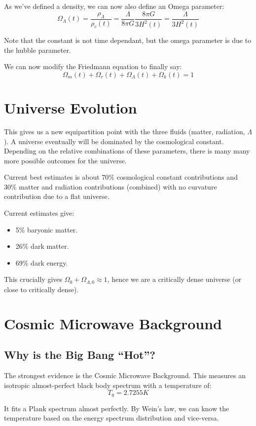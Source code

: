As we've defined a density, we can now also define an Omega parameter:
\[
    \Omega_\Lambda(t) = \frac{\rho_\Lambda}{\rho_c(t)} = \frac{\Lambda}{8 \pi G} \frac{8 \pi G}{3 H^2(t)} = \frac{\Lambda}{3 H^2(t)}
\]

Note that the constant is not time dependant, but the omega parameter is due to the hubble parameter.

We can now modify the Friedmann equation to finally say:
\[
    \Omega_m(t) + \Omega_r(t) + \Omega_\Lambda(t) + \Omega_k(t) = 1
\]

\section{Universe Evolution}
This gives us a new equipartition point with the three fluids (matter, radiation, $\Lambda$). A universe eventually will be dominated by the cosmological constant. Depending on the relative combinations of these parameters, there is many many more possible outcomes for the universe. 

Current best estimates is about $70\%$ cosmological constant contributions and $30\%$ matter and radiation contributions (combined) with no curvature contribution due to a flat universe.

Current estimates give:
\begin{itemize}
    \item 5\% baryonic matter.
    \item 26\% dark matter.
    \item 69\% dark energy.
\end{itemize}

This crucially gives $\Omega_0 + \Omega_{\Lambda, 0} \approx 1$, hence we are a critically dense universe (or close to critically dense).

\section{Cosmic Microwave Background}
\subsection{Why is the Big Bang ``Hot''?}
The strongest evidence is the Cosmic Microwave Background. This measures an isotropic almost-perfect black body spectrum with a temperature of:
\[
    T_0 = 2.7255 \si{K}
\]

It fits a Plank spectrum almost perfectly. By Wein's law, we can know the temperature based on the energy spectrum distribution and vice-versa.

